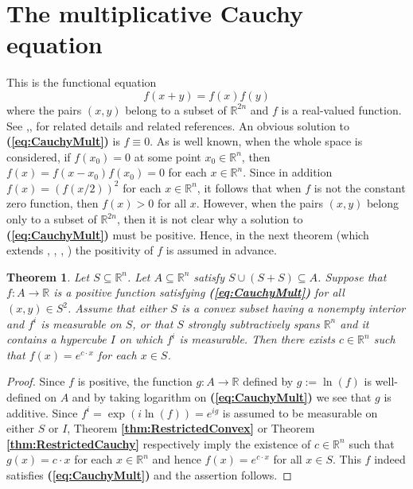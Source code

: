 \documentclass[12 pt]{amsart}
\newtheorem{thm}{Theorem}[section]
\theoremstyle{definition}
\newcommand{\R}{\mathbb{R}}
\newcommand{\bref}[1]{\textbf{\ref{#1}}} %
\newcommand{\beqref}[1]{\textbf{(\ref{#1})}} %
\begin{document}
\section{The multiplicative Cauchy equation}\label{sec:Multiplicative}
This is the functional equation 
\begin{equation}\label{eq:CauchyMult}
f(x+y)=f(x)f(y) 
\end{equation}
where the pairs $(x,y)$ belong to a subset of $\R^{2n}$ and $f$ is a real-valued function. 
See \cite[pp. 37--39]{Aczel},\cite[pp. 28--29]{AczelDhombres},\cite[pp. 343-344, 349--350]{Kuczma2009book} for related 
details and related references. 
An obvious solution to \beqref{eq:CauchyMult} is $f\equiv 0$. 
As is well known, when the whole space is considered, if $f(x_0)=0$ at some point $x_0\in\R^n$, 
then $f(x)=f(x-x_0)f(x_0)=0$ for each $x\in\R^n$. Since in addition $f(x)=(f(x/2))^2$ for each $x\in \R^n$, 
it follows that when $f$ is not the constant zero function, then $f(x)>0$ for all $x$. 
However, when the pairs $(x,y)$ belong only to a subset of $\R^{2n}$, then  
it is not clear why a solution to \beqref{eq:CauchyMult} must be positive. Hence, in the next 
theorem (which extends  \cite[Theorem 1, pp. 38--39]{Aczel},
\cite[Theorem 5, p. 29]{AczelDhombres},
\cite[Theorem 13.1.4, p. 349]{Kuczma2009book}, \cite[Theorem 13.1.7, p. 350]{Kuczma2009book}) 
the positivity of $f$ is assumed in advance. 
\begin{thm}
Let $S\subseteq \R^n$. Let $A\subseteq \R^n$ satisfy $S\cup(S+S)\subseteq A$. 
Suppose that $f:A\to\R$ is a positive function satisfying \beqref{eq:CauchyMult} for all $(x,y)\in S^2$. 
Assume that either $S$ is a convex subset having a nonempty interior and $f^i$ is measurable on $S$, 
or that $S$ strongly subtractively spans $\R^n$ and it contains a hypercube $I$ on which $f^i$ is 
measurable. Then there exists $c\in\R^n$ such that $f(x)=e^{c\cdot x}$ for each $x\in S$. 
\end{thm}
\begin{proof}
Since $f$ is positive, the function $g:A\to\R$ defined by $g:=\ln(f)$ is well-defined on $A$ and by taking logarithm on 
\beqref{eq:CauchyMult} we see that $g$ is additive. Since $f^i=\exp(i\ln(f))=e^{ig}$ is assumed 
to be measurable on either $S$ or $I$, Theorem \bref{thm:RestrictedConvex} or Theorem \bref{thm:RestrictedCauchy} respectively imply  the existence of $c\in\R^n$ 
such that $g(x)=c\cdot x$ for each $x\in \R^n$ and hence $f(x)=e^{c\cdot x}$ for all $x\in S$. This $f$ indeed 
satisfies \beqref{eq:CauchyMult} and the assertion follows. 
\end{proof}
\end{document}

